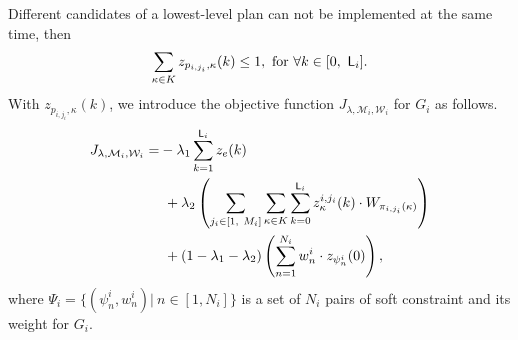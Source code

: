 \documentclass[journal,twoside,web]{IEEEtran}
\newcommand{\Len}{{\sf L}}
\newcommand{\M}{\mathcal{M}}
\newcommand{\W}{\mathcal{W}}
\begin{document}
%
%
Different candidates of a lowest-level plan can not be implemented at the same time, then
\begin{align}\label{hier3}
\sum_{\kappa\in K}{z}_{p_{i,{j_i}},\kappa}(k) \leq 1,~\mbox{for }\forall k\in[0,~\Len_i].
\end{align}
%
With $z_{p_{i,{j_i}},\kappa}(k)$, we introduce the objective function $J_{\lambda,\M_i,\W_i}$ for $G_i$ as follows.
\begin{align}
J_{\lambda,\M_i,\W_i}=&
-\lambda_1\sum_{k=1}^{\Len_i}z_e(k) 
\notag\\&~
+
{\lambda_2}\left(\sum_{j_i\in[1,~M_i]} \sum_{\kappa\in K} \sum_{k=0}^{\Len_i} {z}^{i,{j_i}}_\kappa(k) \cdot {W_{\pi_{i,{j_i}}(\kappa)}}\right)
\notag\\&~
+
(1-{\lambda_1}-{\lambda_2})\left(\sum_{n=1}^{N_i} w^i_{n}\cdot z_{\psi^i_{n}}(0)\right) ,\notag
\end{align}
where $\Psi_i=\{(\psi^i_n,w_n^i)|~n\in[1,N_i]\}$ is a set of $N_i$ pairs of soft constraint and its weight for $G_i$.
%
%
%
\end{document}
